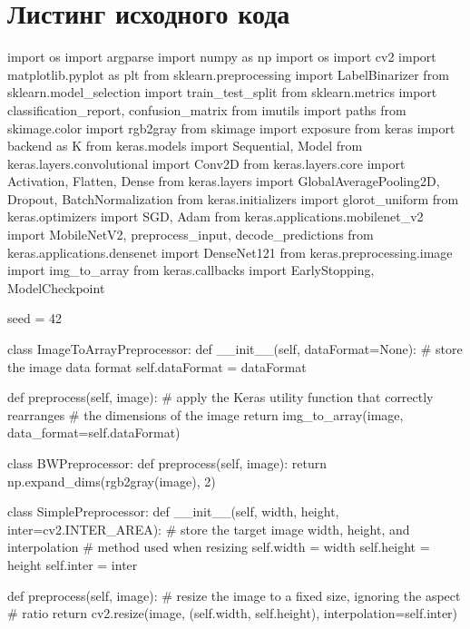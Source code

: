 \chapter{Листинг исходного кода} \label{AppendixA}

\begin{python}
import os
import argparse
import numpy as np
import os
import cv2
import matplotlib.pyplot as plt
from sklearn.preprocessing import LabelBinarizer
from sklearn.model_selection import train_test_split
from sklearn.metrics import classification_report, confusion_matrix
from imutils import paths
from skimage.color import rgb2gray
from skimage import exposure
from keras import backend as K
from keras.models import Sequential, Model
from keras.layers.convolutional import Conv2D
from keras.layers.core import Activation, Flatten, Dense
from keras.layers import GlobalAveragePooling2D, Dropout, BatchNormalization
from keras.initializers import glorot_uniform
from keras.optimizers import SGD, Adam
from keras.applications.mobilenet_v2 import MobileNetV2, preprocess_input, decode_predictions
from keras.applications.densenet import DenseNet121
from keras.preprocessing.image import img_to_array
from keras.callbacks import EarlyStopping, ModelCheckpoint

seed = 42

class ImageToArrayPreprocessor:
    def __init__(self, dataFormat=None):
        # store the image data format
        self.dataFormat = dataFormat
        
    def preprocess(self, image):
        # apply the Keras utility function that correctly rearranges # the dimensions of the image
        return img_to_array(image, data_format=self.dataFormat)


class BWPreprocessor:
    def preprocess(self, image):
        return np.expand_dims(rgb2gray(image), 2)


class SimplePreprocessor:
    def __init__(self, width, height, inter=cv2.INTER_AREA):
        # store the target image width, height, and interpolation # method used when resizing
        self.width = width
        self.height = height
        self.inter = inter
        
    def preprocess(self, image):
        # resize the image to a fixed size, ignoring the aspect # ratio
        return cv2.resize(image, (self.width, self.height),
                                interpolation=self.inter)



\end{python}
